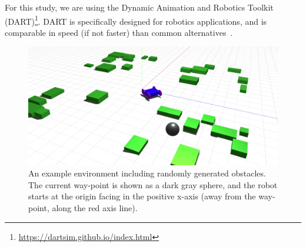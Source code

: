 For this study, we are using the Dynamic Animation and Robotics Toolkit (DART)\footnote{\url{https://dartsim.github.io/index.html}}.
%
DART is specifically designed for robotics applications,
and is comparable in speed (if not faster) than common alternatives~\citep{Mouret.2017.SimER.Simulation}.
%


\begin{figure}[!ht]
    \centering

    \includegraphics[width=0.8\columnwidth]{figures/3-adabot/environment.png}

    \vspace{-0.12in}

    \caption{An example environment including randomly generated obstacles. The current way-point is shown as a dark gray sphere, and the robot starts at the origin facing in the positive x-axis (away from the way-point, along the red axis line).}
    \label{fig:simulation-environment}

    \vspace{-0.15in}

\end{figure}

